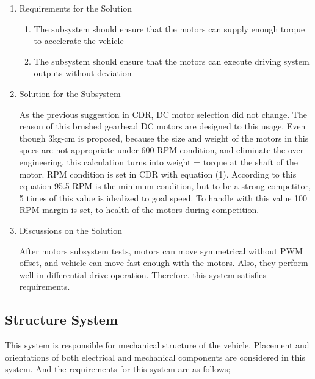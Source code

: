 \documentclass[a4paper,12pt]{article}
\begin{document}
\begin{enumerate}

\item {Requirements for the Solution}


\begin{enumerate}

\item The subsystem should ensure that the motors can supply enough torque to accelerate the vehicle 

\item The subsystem should ensure that the motors can execute driving system outputs without deviation

\end{enumerate} 


\item {Solution for the Subsystem}


As the previous suggestion in CDR, DC motor selection did not change. The reason of this brushed gearhead DC motors are designed to this usage. Even though 3kg-cm is proposed, because the size and weight of the motors in this specs are not appropriate under 600 RPM condition, and eliminate the over engineering, this calculation turns into weight = torque at the shaft of the motor. RPM condition is set in CDR with equation (1). According to this equation 95.5 RPM is the minimum condition, but to be a strong competitor, 5 times of this value is idealized to goal speed. To handle with this value 100 RPM margin is set, to health of the motors during competition.   




\item {Discussions on the Solution}


After motors subsystem tests, motors can move symmetrical without PWM offset, and vehicle can move fast enough with the motors. Also, they perform well in differential drive operation. Therefore, this system satisfies requirements. 


\end{enumerate}	





\subsection{Structure System}


This system is responsible for mechanical structure of the vehicle. Placement and orientations of both electrical and mechanical components are considered in this system. And the requirements for this system are as follows;
\end{document}
